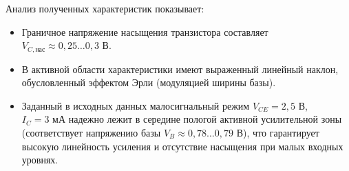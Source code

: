 Анализ полученных характеристик показывает:
\begin{itemize}
    \item Граничное напряжение насыщения транзистора составляет $V_{C,\text{нас}} \approx 0{,}25\dots 0{,}3\text{ В}$.
    \item В активной области характеристики имеют выраженный линейный наклон, обусловленный эффектом Эрли (модуляцией ширины базы).
    \item Заданный в исходных данных малосигнальный режим $V_{CE} = 2{,}5\text{ В}$, $I_C = 3\text{ мА}$ надежно лежит в середине пологой активной усилительной зоны (соответствует напряжению базы $V_B \approx 0{,}78\dots 0{,}79\text{ В}$), что гарантирует высокую линейность усиления и отсутствие насыщения при малых входных уровнях.
\end{itemize}
